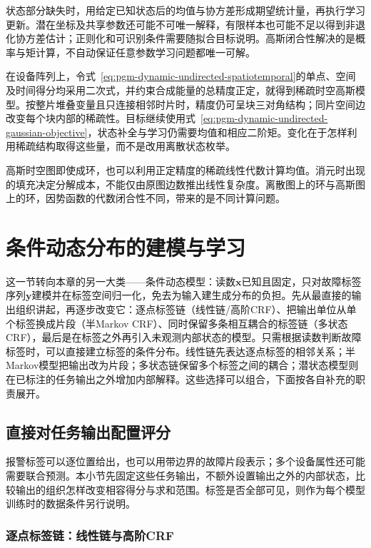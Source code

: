 状态部分缺失时，用给定已知状态后的均值与协方差形成期望统计量，再执行学习更新。潜在坐标及共享参数还可能不可唯一解释，有限样本也可能不足以得到非退化协方差估计；正则化和可识别条件需要随拟合目标说明。高斯闭合性解决的是概率与矩计算，不自动保证任意参数学习问题都唯一可解。

在设备阵列上，令式~\eqref{eq:pgm-dynamic-undirected-spatiotemporal}的单点、空间及时间得分均采用二次式，并约束合成能量的总精度正定，就得到稀疏时空高斯模型。按整片堆叠变量且只连接相邻时片时，精度仍可呈块三对角结构；同片空间边改变每个块内部的稀疏性。目标继续使用式~\eqref{eq:pgm-dynamic-undirected-gaussian-objective}，状态补全与学习仍需要均值和相应二阶矩。变化在于怎样利用稀疏结构取得这些量，而不是改用离散状态枚举。

高斯时空图即使成环，也可以利用正定精度的稀疏线性代数计算均值。消元时出现的填充决定分解成本，不能仅由原图边数推出线性复杂度。离散图上的环与高斯图上的环，因势函数的代数闭合性不同，带来的是不同计算问题。

\section{条件动态分布的建模与学习}
\label{sec:pgm-dynamic-undirected-conditional-models}

这一节转向本章的另一大类——条件动态模型：读数$\bm x$已知且固定，只对故障标签序列$\bm y$建模并在标签空间归一化，免去为输入建生成分布的负担。先从最直接的输出组织讲起，再逐步改变它：逐点标签链（线性链/高阶CRF）、把输出单位从单个标签换成片段（半Markov CRF）、同时保留多条相互耦合的标签链（多状态CRF），最后是在标签之外再引入未观测内部状态的模型。只需根据读数判断故障标签时，可以直接建立标签的条件分布。线性链先表达逐点标签的相邻关系；半Markov模型把输出改为片段；多状态链保留多个标签之间的耦合；潜状态模型则在已标注的任务输出之外增加内部解释。这些选择可以组合，下面按各自补充的职责展开。
\subsection{直接对任务输出配置评分}
\label{sec:pgm-dynamic-undirected-explicit-output}

报警标签可以逐位置给出，也可以用带边界的故障片段表示；多个设备属性还可能需要联合预测。本小节先固定这些任务输出，不额外设置输出之外的内部状态，比较输出的组织怎样改变相容得分与求和范围。标签是否全部可见，则作为每个模型训练时的数据条件另行说明。

\subsubsection{逐点标签链：线性链与高阶CRF}
\label{sec:pgm-energy-models-linear-chain}


